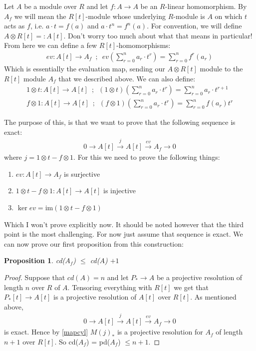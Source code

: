 \documentclass[12pt]{book}
\newtheorem{proposition}[theorem]{Proposition}
\theoremstyle{definition}
\begin{document}
Let $A$ be a module over $R$ and let $f : A \to A$ be an $R$-linear homomorphism. By $A_f$ we will mean the $R[t]$-module whose underlying $R$-module is $A$ on which $t$ acts as $f$, i.e. $a \cdot t = f(a)$ and $a \cdot t^n = f^n(a)$. For convention, we will define $A \otimes R[t] =: A[t]$. Don't worry too much about what that means in particular! From here we can define a few $R[t]$-homomorphisms: 
\begin{align*}
    ev : A[t] \to A_f \, \, \, ; \, \, \, ev(\sum^{n}_{r = 0}a_r \cdot t^r) = \sum^{n}_{r = 0} f^r(a_r) 
\end{align*}
Which is essentially the evaluation map, sending our $A \otimes R[t]$ module to the $R[t]$ module $A_f$ that we described above. We can also define: 
\begin{align*}
    1 \otimes t : A[t] \to A[t] \, \, \, ; \, \, \, (1 \otimes t) (\sum^{n}_{r = 0}a_r \cdot t^r) = \sum^{n}_{r = 0}a_r \cdot t^{r+1}\\
    f \otimes 1 : A[t] \to A[t] \, \, \, ; \, \, \, (f \otimes 1) (\sum^{n}_{r = 0}a_r \cdot t^r) = \sum^n_{r=0}f(a_r)t^r
\end{align*}

The purpose of this, is that we want to prove that the following sequence is exact: 
\begin{align*}
    0 \rightarrow A[t] \xrightarrow{j} A[t] \xrightarrow{ev} A_f \rightarrow 0
\end{align*}
where $j = 1 \otimes t - f \otimes 1$. For this we need to prove the following things: 
\begin{enumerate}
    \item $ev : A[t] \to A_f$ is surjective
    \item $1 \otimes t - f \otimes 1: A[t] \to A[t]$ is injective
    \item $\ker{ev} = \text{im}(1 \otimes t - f \otimes 1)$
\end{enumerate}

Which I won't prove explicitly now. It should be noted however that the third point is the most challenging. For now just assume that sequence is exact. We can now prove our first proposition from this construction: 

\begin{proposition}
    cd($A_f$) $\leq$ cd($A$) $ + 1$
\end{proposition}
\begin{proof}
    Suppose that $cd(A) = n$ and let $P_* \to A$ be a projective resolution of length $n$ over $R$ of $A$. Tensoring everything with $R[t]$ we get that $P_*[t] \to A[t]$ is a projective resolution of $A[t]$ over $R[t]$. As mentioned above, 
    \begin{align*}
        0 \rightarrow A[t] \xrightarrow{j} A[t] \xrightarrow{ev} A_f \rightarrow 0
    \end{align*}
    is exact. Hence by \ref{mapcyl} $M(j)_*$ is a projective resolution for $A_f$ of length $n+1$ over $R[t]$. So cd($A_f$) = pd($A_f$) $\leq n+1$. 
\end{proof}
\end{document}
